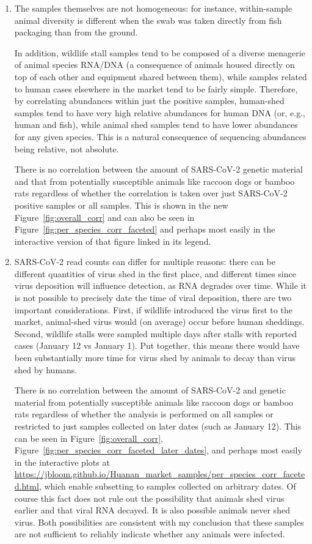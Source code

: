 \documentclass[9pt,twocolumn,twoside]{gsajnl_modified}
\begin{document}
\begin{enumerate}
\begin{enumerate}[label=\alph*)]
\item The samples themselves are not homogeneous: for instance, within-sample animal diversity is different when the swab was taken directly from fish packaging than from the ground.

In addition, wildlife stall samples tend to be composed of a diverse menagerie of animal species RNA/DNA (a consequence of animals housed directly on top of each other and equipment shared between them), while samples related to human cases elsewhere in the market tend to be fairly simple. Therefore, by correlating abundances within just the positive samples, human-shed samples tend to have very high relative abundances for human DNA (or, e.g., human and fish), while animal shed samples tend to have lower abundances for any given species. This is a natural consequence of sequencing abundances being relative, not absolute.

{\color{black}
There is no correlation between the amount of SARS-CoV-2 genetic material and that from potentially susceptible animals like raccoon dogs or bamboo rats regardless of whether the correlation is taken over just SARS-CoV-2 positive samples or all samples. 
This is shown in the new Figure~\ref{fig:overall_corr} and can also be seen in Figure~\ref{fig:per_species_corr_faceted} and perhaps most easily in the interactive version of that figure linked in its legend.
}

\item SARS-CoV-2 read counts can differ for multiple reasons: there can be different quantities of virus shed in the first place, and different times since virus deposition will influence detection, as RNA degrades over time. While it is not possible to precisely date the time of viral deposition, there are two important considerations. First, if wildlife introduced the virus first to the market, animal-shed virus would (on average) occur before human sheddings. Second, wildlife stalls were sampled multiple days after stalls with reported cases (January 12 vs January 1). Put together, this means there would have been substantially more time for virus shed by animals to decay than virus shed by humans.

{
\color{black}
There is no correlation between the amount of SARS-CoV-2 and genetic material from potentially susceptible animals like raccoon dogs or bamboo rats regardless of whether the analysis is performed on all samples or restricted to just samples collected on later dates (such as January 12).
This can be seen in Figure~\ref{fig:overall_corr}, Figure~\ref{fig:per_species_corr_faceted_later_dates}, and perhaps most easily in the interactive plots at  \url{https://jbloom.github.io/Huanan_market_samples/per_species_corr_faceted.html}, which enable subsetting to samples collected on arbitrary dates.
Of course this fact does not rule out the possibility that animals shed virus earlier and that viral RNA decayed.
It is also possible animals never shed virus.
Both possibilities are consistent with my conclusion that these samples are not sufficient to reliably indicate whether any animals were infected.
}


\end{enumerate}
\end{enumerate}
\end{document}
